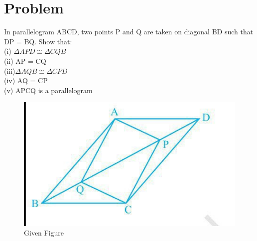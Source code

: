 \documentclass[10pt, a4paper]{article}
\begin{document}
\title{\mytitle}
\author{\myauthor\hspace{1em}\\\contact\\FWC22011\hspace{6.5em}IITH\hspace{0.5em}\mymodule\hspace{6em}Matrix:Lines}

\date{}
\maketitle


  \section{Problem}
In parallelogram ABCD, two points P and Q are
taken on diagonal BD such that DP = BQ. Show that: \\
(i) $\Delta APD \cong \Delta CQB$  \\       
(ii) AP = CQ\\
(iii)$\Delta AQB \cong \Delta CPD$  \\   
(iv) AQ = CP   \\
(v) APCQ is a parallelogram \\
\begin{figure}[h]
\centering
\includegraphics[scale=0.5]{ABCD.png} 
\caption{Given Figure}
\end{figure}
\end{document}
